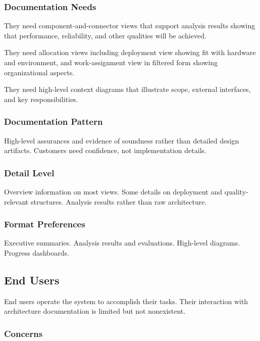 \documentclass[11pt]{article}
\begin{document}
\subsubsection{Documentation Needs}

They need component-and-connector views that support analysis results showing that performance, reliability, and other qualities will be achieved.

They need allocation views including deployment view showing fit with hardware and environment, and work-assignment view in filtered form showing organizational aspects.

They need high-level context diagrams that illustrate scope, external interfaces, and key responsibilities.

\subsubsection{Documentation Pattern}

High-level assurances and evidence of soundness rather than detailed design artifacts. Customers need confidence, not implementation details.

\subsubsection{Detail Level}

Overview information on most views. Some details on deployment and quality-relevant structures. Analysis results rather than raw architecture.

\subsubsection{Format Preferences}

Executive summaries. Analysis results and evaluations. High-level diagrams. Progress dashboards.

\subsection{End Users}

End users operate the system to accomplish their tasks. Their interaction with architecture documentation is limited but not nonexistent.

\subsubsection{Concerns}
\end{document}
